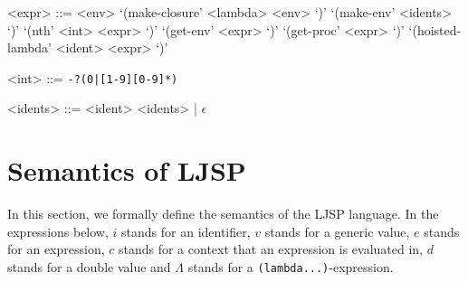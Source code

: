 \documentclass[11pt]{report}
\begin{document}
\begin{grammar}
<expr> ::= <env>
\alt `(make-closure' <lambda> <env> `)'
\alt `(make-env' <idents> `)'
\alt `(nth' <int> <expr> `)'
\alt `(get-env' <expr> `)'
\alt `(get-proc' <expr> `)'
\alt `(hoisted-lambda' <ident> <expr> `)'

<int> ::= \texttt{-?(0|[1-9][0-9]*)}

<idents> ::= <ident> <idents> | $\epsilon$
\end{grammar}


\section{Semantics of LJSP}
In this section, we formally define the semantics of the LJSP language. In the expressions below, $i$ stands for an identifier, $v$ stands for a generic value, $e$ stands for an expression, $c$ stands for a context that an expression is evaluated in, $d$ stands for a double value and $\Lambda$ stands for a \texttt{(lambda...)}-expression.
\end{document}
